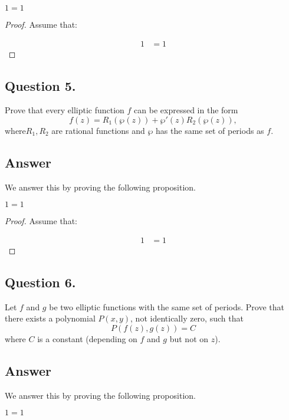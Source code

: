 \begin{proposition}[2]
    $1=1$
\end{proposition}

\begin{proof}
    Assume that:

    \begin{align*}
        1 &= 1
    \end{align*}

\end{proof}


\subsection{Question 5.}
\noindent
Prove that every elliptic function $f$ can be expressed in the form
\[
    f(z) = R_1(\wp(z))+ \wp'(z)R_2(\wp(z)),
\]
where$R_1, R_2$ are rational functions and $\wp$ has the same set of periods as $f$.

\subsection*{Answer}
\noindent
We answer this by proving the following proposition.

\begin{proposition}
    $1=1$
\end{proposition}

\begin{proof}
    Assume that:

    \begin{align*}
        1 &= 1
    \end{align*}

\end{proof}


\subsection{Question 6.}
\noindent
Let $f$ and $g$ be two elliptic functions with the same set of periods. Prove that there exists a polynomial $P(x, y)$,
not identically zero, such that
\[
    P(f(z), g(z) )= C
\]
where $C$ is a constant (depending on $f$ and $g$ but not on $z$).

\subsection*{Answer}
\noindent
We answer this by proving the following proposition.

\begin{proposition}
    $1=1$
\end{proposition}

